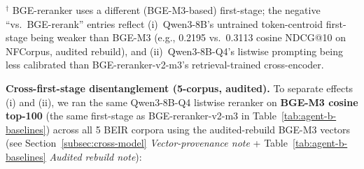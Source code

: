 \documentclass[review,1p]{elsarticle}
\begin{document}
\begin{table}[h]
\centering
\small
\caption{LLM-listwise reranker (NDCG@10). Qwen3-8B-Q4 reranks cosine top-20 (RankGPT-style) on the same Qwen3 token-centroid first-stage as our \emph{Cosine} baseline. ``vs.\ Cosine'': relative gain (apples-to-apples); ``vs.\ BGE-rerank'': context only (different first-stage). Result is sharply task-dependent (helps NFCorpus, neutral on SciFact, hurts ArguAna). Code: \texttt{benchmark/llm\_rerank\_bench.py}.}
\label{tab:llm-listwise}
\end{table}

\noindent$^{\dag}$ BGE-reranker uses a different (BGE-M3-based) first-stage; the negative ``vs.\ BGE-rerank'' entries reflect (i)~Qwen3-8B's untrained token-centroid first-stage being weaker than BGE-M3 (e.g., 0.2195 vs.\ 0.3113 cosine NDCG@10 on NFCorpus, audited rebuild), and (ii)~Qwen3-8B-Q4's listwise prompting being less calibrated than BGE-reranker-v2-m3's retrieval-trained cross-encoder.

\textbf{Cross-first-stage disentanglement (5-corpus, audited).} To separate effects (i) and (ii), we ran the same Qwen3-8B-Q4 listwise reranker on \textbf{BGE-M3 cosine top-100} (the same first-stage as BGE-reranker-v2-m3 in Table~\ref{tab:agent-b-baselines}) across all 5 BEIR corpora using the audited-rebuild BGE-M3 vectors (see Section~\ref{subsec:cross-model} \textit{Vector-provenance note} + Table~\ref{tab:agent-b-baselines} \textit{Audited rebuild note}):
\end{document}
